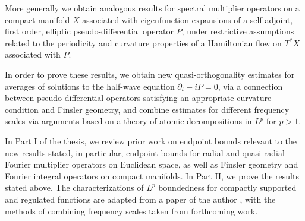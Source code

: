 
%
% 
%


More generally we obtain analogous results for spectral multiplier operators on a compact manifold $X$ associated with eigenfunction expansions of a self-adjoint, first order, elliptic pseudo-differential operator $P$, under restrictive assumptions related to the periodicity and curvature properties of a Hamiltonian flow on $T^* X$ associated with $P$.

In order to prove these results, we obtain new quasi-orthogonality estimates for averages of solutions to the half-wave equation $\partial_t - i P = 0$, via a connection between pseudo-differential operators satisfying an appropriate curvature condition and Finsler geometry, and combine estimates for different frequency scales via arguments based on a theory of atomic decompositions in $L^p$ for $p > 1$.

In Part I of the thesis, we review prior work on endpoint bounds relevant to the new results stated, in particular, endpoint bounds for radial and quasi-radial Fourier multiplier operators on Euclidean space, as well as Finsler geometry and Fourier integral operators on compact manifolds. In Part II, we prove the results stated above. The characterizations of $L^p$ boundedness for compactly supported and regulated functions are adapted from a paper of the author \cite{Denson}, with the methods of combining frequency scales taken from forthcoming work.